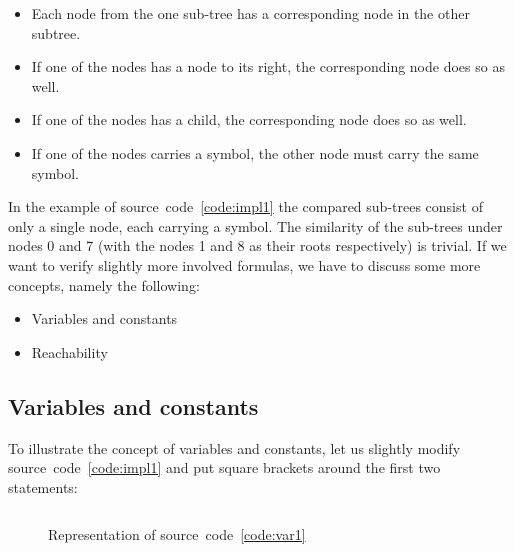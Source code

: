 \documentclass[british]{article}
\newenvironment{code}{\captionsetup{type=listing}}{}
\newcommand\prv{bc}
\begin{document}
\begin{itemize}
	\item 
		Each node from the one sub-tree has a corresponding node in the other
		subtree.
	\item
		If one of the nodes has a node to its right, the corresponding node does
		so as well.
	\item
		If one of the nodes has a child, the corresponding node does so as well.
	\item
		If one of the nodes carries a symbol, the other node must carry the same
		symbol.
\end{itemize}

In the example of source~code~\ref{code:impl1} the compared sub-trees consist of
only a single node, each carrying a symbol. The similarity of the sub-trees
under nodes 0 and 7 (with the nodes 1 and 8 as their roots respectively) is
trivial. If we want to verify slightly more involved formulas, we have to
discuss some more concepts, namely the following:

\begin{itemize}
	\item 
		Variables and constants
	\item 
		Reachability
\end{itemize}

\pagebreak{}

\subsection{Variables and constants}\label{sec:var}

To illustrate the concept of variables and constants, let us slightly modify
source~code~\ref{code:impl1} and put square brackets around the first two
statements:

\begin{code}
\label{code:var1}
\inputminted[linenos]{\prv}{examples/var1.prove}
\end{code}

\begin{figure}[!h]
\caption{Representation of source~code~\ref{code:var1}}\label{fig:var1}
\centering
{}
\end{figure}
\end{document}
